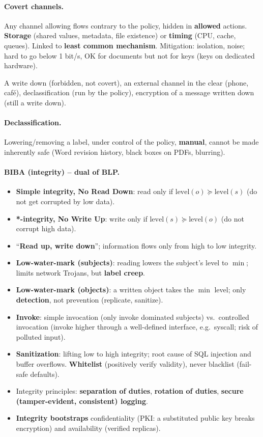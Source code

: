 \paragraph{Covert channels.} Any channel allowing flows contrary to the policy, hidden in \textbf{allowed} actions. \textbf{Storage} (shared values, metadata, file existence) or \textbf{timing} (CPU, cache, queues). Linked to \textbf{least common mechanism}. Mitigation: isolation, noise; hard to go below 1 bit/s, OK for documents but not for keys (keys on dedicated hardware).
\begin{remark}
A write down (forbidden, not covert), an external channel in the clear (phone, café), declassification (run by the policy), encryption of a message written down (still a write down).
\end{remark}

\paragraph{Declassification.} Lowering/removing a label, under control of the policy, \textbf{manual}, cannot be made inherently safe (Word revision history, black boxes on PDFs, blurring).

\paragraph{BIBA (integrity) -- dual of BLP.}
\begin{itemize}
    \item \textbf{Simple integrity, No Read Down}: read only if $\text{level}(o) \succeq \text{level}(s)$ (do not get corrupted by low data).
    \item \textbf{*-integrity, No Write Up}: write only if $\text{level}(s) \succeq \text{level}(o)$ (do not corrupt high data).
    \item ``\textbf{Read up, write down}''; information flows only from high to low integrity.
    \item \textbf{Low-water-mark (subjects)}: reading lowers the subject's level to $\min$; limits network Trojans, but \textbf{label creep}.
    \item \textbf{Low-water-mark (objects)}: a written object takes the $\min$ level; only \textbf{detection}, not prevention (replicate, sanitize).
    \item \textbf{Invoke}: simple invocation (only invoke dominated subjects) vs.\ controlled invocation (invoke higher through a well-defined interface, e.g.\ syscall; risk of polluted input).
    \item \textbf{Sanitization}: lifting low to high integrity; root cause of SQL injection and buffer overflows. \textbf{Whitelist} (positively verify validity), never blacklist (fail-safe defaults).
    \item Integrity principles: \textbf{separation of duties}, \textbf{rotation of duties}, \textbf{secure (tamper-evident, consistent) logging}.
    \item \textbf{Integrity bootstraps} confidentiality (PKI: a substituted public key breaks encryption) and availability (verified replicas).
\end{itemize}


